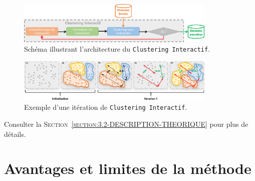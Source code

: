 		
		\begin{figure}[H]
			\centering
			\includegraphics[width=0.85\textwidth]{figures/interactive-clustering-architecture-sequentielle}
			\caption{
				Schéma illustrant l'architecture du \texttt{Clustering Interactif}.
			}
			\label{figure:5.1-GUIDE-PRESENTATION-RAPIDE-CLUSTERING-INTERACTIF}
		\end{figure}
		
		\begin{figure}[H]
			\centering
			\includegraphics[width=0.85\textwidth]{figures/example-iteration-clustering-interatif}
			\caption{
				Exemple d'une itération de \texttt{Clustering Interactif}.
			}
			\label{figure:5.1-GUIDE-PRESENTATION-RAPIDE-EXEMPLE}
		\end{figure}
		
		\begin{leftBarReminder}
			Consulter la \textsc{Section~\ref{section:3.2-DESCRIPTION-THEORIQUE}} pour plus de détails.
		\end{leftBarReminder}
	
	
	\newpage
	\section{Avantages et limites de la méthode}
	\label{section:5.2-GUIDE-AVANTAGES-ET-LIMITES}
	
